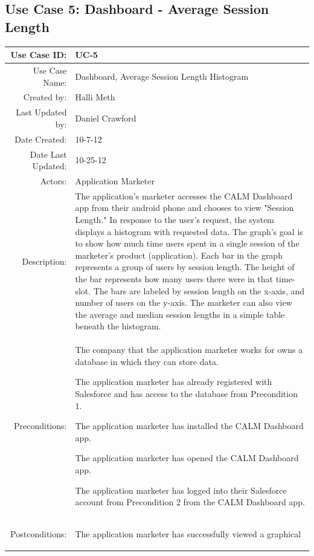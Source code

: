 \documentclass[12pt,oneside,letterpaper]{article}
\newenvironment{packed_enumerate}{ %
\vspace{-7mm}
\begin{enumerate}
  \setlength{\itemsep}{0pt}
  \setlength{\parskip}{0pt}
  \setlength{\parsep}{0pt}
}{\end{enumerate}
\vspace{-8mm}}
\begin{document}
\subsection{\label{DashboardSessionLength}Use Case 5: Dashboard - Average Session Length}
\begin{longtable}{|r|p{3.8in}|}
\hline
Use Case ID:&UC-5\\
\hline
Use Case Name:&Dashboard, Average Session Length Histogram\\
\hline
Created by:&Halli Meth\\
\hline
Last Updated by:&Daniel Crawford\\
\hline
Date Created:&10-7-12\\
\hline
Date Last Updated:&10-25-12\\
\hline
Actors:&Application Marketer\\
\hline
Description:&The application's marketer accesses the CALM Dashboard 
app from their android phone and chooses to view "Session Length." In 
response to the user's request, the system displays a histogram with 
requested data. The graph's goal is to show how much time users spent 
in a single session of the marketer's product (application). Each bar 
in the graph represents a group of users by session length. The height 
of the bar represents how many users there were in that time-slot. The 
bars are labeled by session length on the x-axis, and number of users 
on the y-axis. The marketer can also view the average and median 
session lengths in a simple table beneath the histogram.\\
\hline
Preconditions:&
\begin{packed_enumerate}
\item The company that the application marketer works for owns a 
database in which they can store data.
\item The application marketer has already registered with Salesforce 
and has access to the database from Precondition 1.
\item The application marketer has installed the CALM Dashboard app.
\item The application marketer has opened the CALM Dashboard app.
\item The application marketer has logged into their Salesforce 
account from Precondition 2 from the CALM Dashboard app.
\end{packed_enumerate}\\
\hline
Postconditions:&
\begin{packed_enumerate}
\item The application marketer has successfully viewed a graphical 

\end{packed_enumerate}
\end{longtable}
\end{document}
